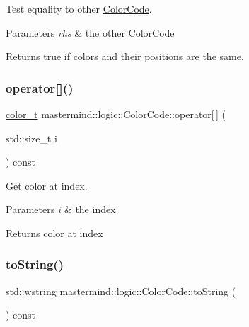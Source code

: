 Test equality to other \hyperlink{classmastermind_1_1logic_1_1_color_code}{Color\+Code}. 


\begin{DoxyParams}{Parameters}
{\em rhs} & the other \hyperlink{classmastermind_1_1logic_1_1_color_code}{Color\+Code} \\
\hline
\end{DoxyParams}
\begin{DoxyReturn}{Returns}
{\ttfamily true} if colors and their positions are the same. 
\end{DoxyReturn}
\hypertarget{classmastermind_1_1logic_1_1_color_code_a74577852416c1438e6f1f43d4a9a21d2}{}\label{classmastermind_1_1logic_1_1_color_code_a74577852416c1438e6f1f43d4a9a21d2} 
\subsubsection{\texorpdfstring{operator[]()}{operator[]()}}
{\footnotesize\ttfamily \hyperlink{namespacemastermind_1_1logic_aab4e2166db8e8e5dcbed785c7927eca1}{color\+\_\+t} mastermind\+::logic\+::\+Color\+Code\+::operator\mbox{[}$\,$\mbox{]} (\begin{DoxyParamCaption}\item[{std\+::size\+\_\+t}]{i }\end{DoxyParamCaption}) const}



Get color at index. 


\begin{DoxyParams}{Parameters}
{\em i} & the index \\
\hline
\end{DoxyParams}
\begin{DoxyReturn}{Returns}
color at index 
\end{DoxyReturn}
\hypertarget{classmastermind_1_1logic_1_1_color_code_a5d3903d505ecbd831d7e3776a0076c51}{}\label{classmastermind_1_1logic_1_1_color_code_a5d3903d505ecbd831d7e3776a0076c51} 
\subsubsection{\texorpdfstring{to\+String()}{toString()}}
{\footnotesize\ttfamily std\+::wstring mastermind\+::logic\+::\+Color\+Code\+::to\+String (\begin{DoxyParamCaption}{ }\end{DoxyParamCaption}) const\hspace{0.3cm}{\ttfamily [virtual]}}



